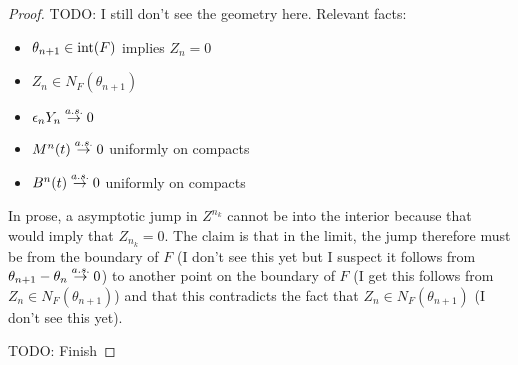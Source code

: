 \begin{proof}
TODO: I still don't see the geometry here.  Relevant facts: 
\begin{itemize}
\item $\theta_{n+1} \in \operatorname*{int}(F)$ implies $Z_n = 0$
\item $Z_n \in N_F(\theta_{n+1})$
\item $\epsilon_n Y_n \overset{a.s.}\to 0$
\item $M^n(t) \overset{a.s.}\to 0$ uniformly on compacts
\item $B^n(t) \overset{a.s.}\to 0$ uniformly on compacts
\end{itemize}
In prose, a asymptotic jump in $Z^{n_k}$ cannot be into the interior because that would imply that $Z_{n_k} = 0$.  The claim is that in the limit, the jump therefore must be from the boundary of $F$ (I don't see this yet but I suspect it follows from $\theta_{n+1} - \theta_n \overset{a.s.}\to 0$) to another point on the boundary of $F$ (I get this follows from $Z_n \in N_F(\theta_{n+1})$) and that this contradicts the fact that $Z_n \in N_F(\theta_{n+1})$ (I don't see this yet).

TODO: Finish
\end{proof}